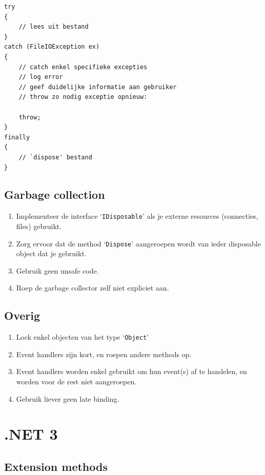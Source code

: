 \documentclass[a4paper,11pt]{article}
\begin{document}
\begin{lstlisting}[float,caption=Exception handling]
try
{
	// lees uit bestand
}
catch (FileIOException ex)
{
	// catch enkel specifieke excepties
	// log error
	// geef duidelijke informatie aan gebruiker
	// throw zo nodig exceptie opnieuw:

	throw;
}
finally
{
	// `dispose' bestand
}
\end{lstlisting}

\subsection{Garbage collection}

\begin{enumerate}[resume]
\item Implementeer de interface `\lstinline !IDisposable!' als je externe resources (connecties,
files) gebruikt.
\item Zorg ervoor dat de method `\lstinline !Dispose!' aangeroepen wordt van ieder disposable
object dat je gebruikt.
\item Gebruik geen unsafe code.
\item Roep de garbage collector zelf niet expliciet aan.
\end{enumerate}

\subsection{Overig}

\begin{enumerate}[resume]
\item Lock enkel objecten van het type `\lstinline !Object!'
\item Event handlers zijn kort, en roepen andere methods op.
\item Event handlers worden enkel gebruikt om hun event(s) af te handelen, en worden voor de rest
niet aangeroepen.
\item Gebruik liever geen late binding.
\end{enumerate}

\section{.NET 3}


\subsection{Extension methods}
\end{document}
